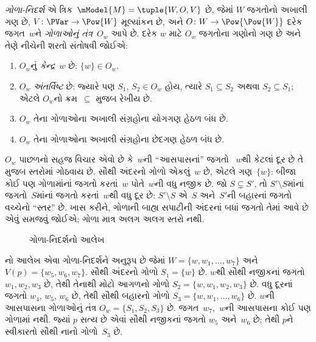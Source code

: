 \begin{defn}
  \emph{ગોળા-નિદર્શ} એ ત્રિક~$\mModel{M} = \tuple{W, O, V}$ છે,
  જેમાં $W$ જગતોનો અખાલી ગણ છે, $V\colon \PVar \to \Pow{W}$
  મૂલ્યાંકન છે, અને $O\colon W \to \Pow{\Pow{W}}$ દરેક જગત~$w$ને
  \emph{ગોળાઓનું તંત્ર}~$O_w$ આપે છે. દરેક $w$ માટે $O_w$ જગતોના
  ગણોનો ગણ છે અને તેણે નીચેની શરતો સંતોષવી જોઈએ:
  \begin{enumerate}
  \item $O_w$નું \emph{કેન્દ્ર}~$w$ છે: $\{w\} \in O_w$.
  \item $O_w$ \emph{અંતર્વિષ્ટ} છે: જ્યારે પણ $S_1$, $S_2 \in O_w$
    હોય, ત્યારે $S_1 \subseteq S_2$ અથવા $S_2 \subseteq S_1$;
    એટલે $O_w$નો ક્રમ~$\subseteq$ મુજબ રેખીય છે.
  \item $O_w$ તેના ગોળાઓના અખાલી સંગ્રહોના યોગગણ હેઠળ બંધ છે.
  \item $O_w$ તેના ગોળાઓના અખાલી સંગ્રહોના છેદગણ હેઠળ બંધ છે.
  \end{enumerate}
\end{defn}

$O_w$ પાછળનો સહજ વિચાર એવો છે કે~$w$ની ``આસપાસનાં'' જગતો
~$w$થી કેટલાં દૂર છે તે મુજબ સ્તરોમાં ગોઠવાય છે. સૌથી અંદરનો
ગોળો એકલું~$w$ છે, એટલે ગણ~$\{w\}$: બીજા કોઈ પણ ગોળામાંનાં
જગતો કરતાં~$w$ પોતે~$w$ની વધુ નજીક છે. જો $S \subsetneq S'$, તો
$S' \setminus S$માંનાં જગતો~$S$માંનાં જગતો કરતાં~$w$થી વધુ દૂર
છે: $S' \setminus S$ એ~$S$ અને~$S'$ની બહારનાં જગતો વચ્ચેનો
``સ્તર'' છે. ખાસ કરીને, ગોળાની બાહ્ય સપાટીની અંદરનાં બધાં જગતો
તેમાં આવે છે એવું સમજવું જોઈએ; ગોળા માત્ર અલગ અલગ સ્તરો નથી.

\begin{figure}
\begin{center}
\caption{ગોળા-નિદર્શનો આલેખ}
\end{center}
\end{figure}

નો આલેખ એવા ગોળા-નિદર્શને અનુરૂપ છે જેમાં
$W = \{w, w_1, \dots, w_7\}$ અને $V(p) = \{w_5, w_6,
w_7\}$. સૌથી અંદરનો ગોળો $S_1 = \{w\}$ છે. $w$થી સૌથી નજીકનાં
જગતો $w_1, w_2, w_3$ છે, તેથી તેનાથી મોટો આગળનો ગોળો
$S_2 = \{w, w_1, w_2, w_3\}$ છે. વધુ દૂરનાં જગતો $w_4$, $w_5$,
$w_6$ છે, તેથી સૌથી બહારનો ગોળો
$S_3 = \{w, w_1, \dots, w_6\}$ છે. $w$ની આસપાસના ગોળાઓનું તંત્ર
$O_w = \{S_1, S_2, S_3\}$ છે. જગત~$w_7$,~$w$ની આસપાસના કોઈ
પણ ગોળામાં નથી. જ્યાં $p$ સત્ય છે એવાં સૌથી નજીકનાં જગતો $w_5$
અને~$w_6$ છે; તેથી $p$ને સ્વીકારતો સૌથી નાનો ગોળો~$S_3$ છે.

